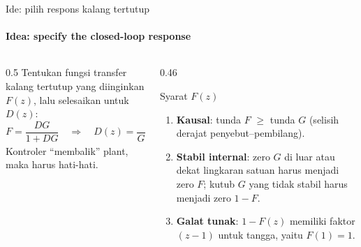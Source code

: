 \documentclass[aspectratio=169,10pt]{beamer}
\begin{document}
\begin{frame}{Ide: pilih respons kalang tertutup}
	\framesubtitle{Idea: specify the closed-loop response}
	\begin{columns}[T]
		\begin{column}{0.5\textwidth}
			\small
			Tentukan fungsi transfer kalang tertutup yang diinginkan $F(z)$, lalu selesaikan untuk $D(z)$:
			\[
				F = \frac{DG}{1+DG}\quad\Longrightarrow\quad
				\boxed{D(z) = \frac{1}{G(z)}\,\frac{F(z)}{1-F(z)}}
			\]
			Kontroler ``membalik'' plant, maka harus hati-hati.
		\end{column}
		\begin{column}{0.46\textwidth}
			\begin{alertblock}{Syarat $F(z)$}
				\small
				\begin{enumerate}
					\item \textbf{Kausal}: tunda $F$ $\ge$ tunda $G$ (selisih derajat penyebut--pembilang).
					\item \textbf{Stabil internal}: zero $G$ di luar atau dekat lingkaran satuan harus menjadi zero $F$; kutub $G$ yang tidak stabil harus menjadi zero $1-F$.
					\item \textbf{Galat tunak}: $1-F(z)$ memiliki faktor $(z-1)$ untuk tangga, yaitu $F(1)=1$.
				\end{enumerate}
			\end{alertblock}
		\end{column}
	\end{columns}
\end{frame}
\end{document}
